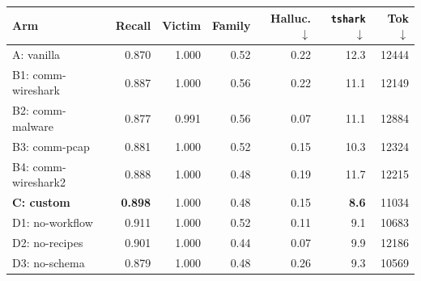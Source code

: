 \begin{tabular}{@{}lrrrrrr@{}}
\toprule
Arm & Recall & Victim & Family & Halluc.$\downarrow$ & \texttt{tshark}$\downarrow$ & Tok$\downarrow$ \\
\midrule
A: vanilla & 0.870 & 1.000 & 0.52 & 0.22 & 12.3 & 12444 \\
B1: comm-wireshark & 0.887 & 1.000 & 0.56 & 0.22 & 11.1 & 12149 \\
B2: comm-malware & 0.877 & 0.991 & 0.56 & 0.07 & 11.1 & 12884 \\
B3: comm-pcap & 0.881 & 1.000 & 0.52 & 0.15 & 10.3 & 12324 \\
B4: comm-wireshark2 & 0.888 & 1.000 & 0.48 & 0.19 & 11.7 & 12215 \\
\midrule
\textbf{C: custom} & \textbf{0.898} & 1.000 & 0.48 & 0.15 & \textbf{8.6} & 11034 \\
D1: no-workflow & 0.911 & 1.000 & 0.52 & 0.11 & 9.1 & 10683 \\
D2: no-recipes & 0.901 & 1.000 & 0.44 & 0.07 & 9.9 & 12186 \\
D3: no-schema & 0.879 & 1.000 & 0.48 & 0.26 & 9.3 & 10569 \\
\bottomrule
\end{tabular}